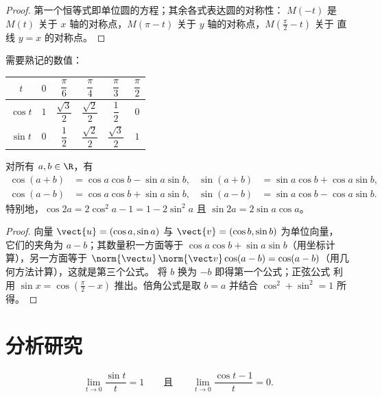 \begin{proof}
第一个恒等式即单位圆的方程；其余各式表达圆的对称性：
$M(-t)$ 是 $M(t)$ 关于
$x$ 轴的对称点，$M(\pi - t)$ 关于 $y$ 轴的对称点，$M(\frac\pi2 - t)$ 关于
直线 $y = x$ 的对称点。
\end{proof}

需要熟记的数值：
\begin{center}
\begin{tabular}{c|ccccc}
$t$ & $0$ & $\dfrac{\pi}{6}$ & $\dfrac{\pi}{4}$ & $\dfrac{\pi}{3}$ & $\dfrac{\pi}{2}$\\[6pt]
\hline\rule{0pt}{14pt}%
$\cos t$ & $1$ & $\dfrac{\sqrt3}{2}$ & $\dfrac{\sqrt2}{2}$ & $\dfrac12$ & $0$\\[6pt]
$\sin t$ & $0$ & $\dfrac12$ & $\dfrac{\sqrt2}{2}$ & $\dfrac{\sqrt3}{2}$ & $1$
\end{tabular}
\end{center}

\begin{proposition}[加法公式]\label{prop:g12:trigo:addition}
对所有 $a, b \in \R$，有
\begin{align*}
\cos(a+b) &= \cos a \cos b - \sin a \sin b, &
\sin(a+b) &= \sin a \cos b + \cos a \sin b,\\
\cos(a-b) &= \cos a \cos b + \sin a \sin b, &
\sin(a-b) &= \sin a \cos b - \cos a \sin b.
\end{align*}
特别地，$\cos 2a = 2\cos^2 a - 1 = 1 - 2\sin^2 a$ 且
$\sin 2a = 2 \sin a \cos a$。
\end{proposition}

\begin{proof}
向量 $\vect{u} = (\cos a, \sin a)$ 与 $\vect{v} = (\cos b, \sin b)$ 为单位向量，
它们的夹角为 $a - b$；其数量积一方面等于
$\cos a\cos b + \sin a \sin b$（用坐标计算），另一方面等于
$\norm{\vect u}\,\norm{\vect v}\cos(a-b) = \cos(a - b)$（用几何方法计算），这就是第三个公式。
将 $b$ 换为 $-b$ 即得第一个公式；正弦公式
利用 $\sin x = \cos(\frac\pi2 - x)$ 推出。倍角公式是取
$b = a$ 并结合 $\cos^2 + \sin^2 = 1$ 所得。
\end{proof}

\section{分析研究}

\begin{lemma}[基本极限]\label{lem:g12:trigo:sinxx}
\[
\lim_{t \to 0} \frac{\sin t}{t} = 1
\qquad\text{且}\qquad
\lim_{t \to 0} \frac{\cos t - 1}{t} = 0 .
\]
\end{lemma}

